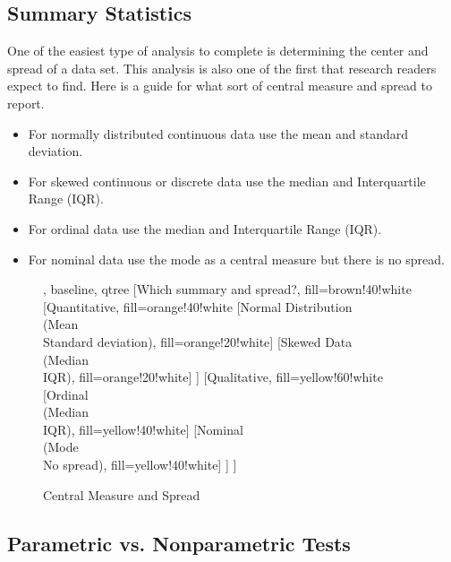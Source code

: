 \subsection{Summary Statistics}

One of the easiest type of analysis to complete is determining the center and spread of a data set. This analysis is also one of the first that research readers expect to find. Here is a guide for what sort of central measure and spread to report.

\begin{itemize}
	\item For normally distributed continuous data use the mean and standard deviation.
	\item For skewed continuous or discrete data use the median and Interquartile Range (IQR).
	\item For ordinal data use the median and Interquartile Range (IQR).
	\item For nominal data use the mode as a central measure but there is no spread.
\end{itemize}

\begin{figure}[H]
	\centering
	
	
	\begin{forest}, baseline, qtree
		[Which summary and spread?, fill=brown!40!white
			[{Quantitative}, fill=orange!40!white
				[{Normal Distribution\\(Mean\\Standard deviation)}, fill=orange!20!white]
				[{Skewed Data\\(Median\\IQR)}, fill=orange!20!white]
			]
			[{Qualitative}, fill=yellow!60!white
				[{Ordinal\\(Median\\IQR)}, fill=yellow!40!white]
				[{Nominal\\(Mode\\No spread)}, fill=yellow!40!white]
			]
		]
	\end{forest}
	
	\caption{Central Measure and Spread}
	\label{fig06.09}
\end{figure}

\subsection{Parametric vs. Nonparametric Tests}

